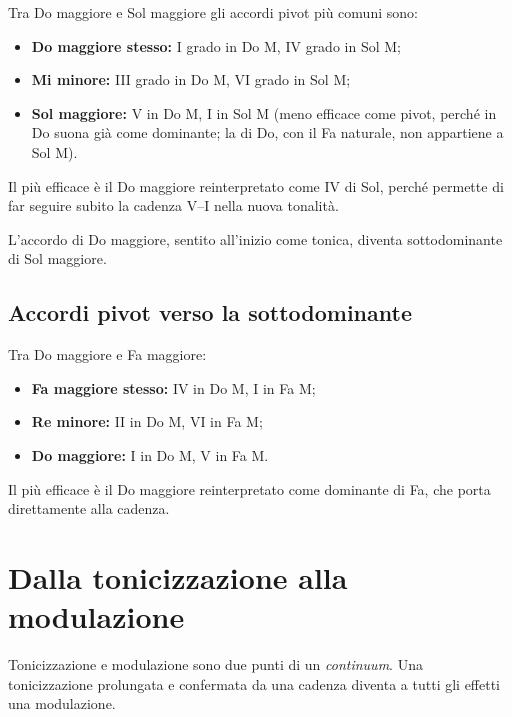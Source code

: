\begin{regola}
	\label{reg:pivot_dominante}
	Tra Do maggiore e Sol maggiore gli accordi pivot più comuni sono:
	\begin{itemize}
		\item \textbf{Do maggiore stesso:} I grado in Do M, IV grado in Sol M;
		\item \textbf{Mi minore:} III grado in Do M, VI grado in Sol M;
		\item \textbf{Sol maggiore:} V in Do M, I in Sol M (meno efficace come pivot, perché in Do suona già come dominante; la  di Do, con il Fa naturale, non appartiene a Sol M).
	\end{itemize}
	Il più efficace è il Do maggiore reinterpretato come IV di Sol, perché permette di far seguire subito la cadenza V--I nella nuova tonalità.
\end{regola}

\begin{esempio}[Modulazione Do maggiore $\rightarrow$ Sol maggiore con pivot I = IV]
	\label{ex:mod_do_sol}
	L'accordo di Do maggiore, sentito all'inizio come tonica, diventa sottodominante di Sol maggiore.
\end{esempio}

\subsection{Accordi pivot verso la sottodominante}
\label{subsec:pivot_sottodominante}

\begin{regola}
	\label{reg:pivot_sottodominante}
	Tra Do maggiore e Fa maggiore:
	\begin{itemize}
		\item \textbf{Fa maggiore stesso:} IV in Do M, I in Fa M;
		\item \textbf{Re minore:} II in Do M, VI in Fa M;
		\item \textbf{Do maggiore:} I in Do M, V in Fa M.
	\end{itemize}
	Il più efficace è il Do maggiore reinterpretato come dominante di Fa, che porta direttamente alla cadenza.
\end{regola}

\begin{esempio}[Modulazione Do maggiore $\rightarrow$ Fa maggiore con pivot I = V]
	\label{ex:mod_do_fa}
\end{esempio}

\section{Dalla tonicizzazione alla modulazione}
\label{sec:collegamento_mod}

Tonicizzazione e modulazione sono due punti di un \textit{continuum}. Una tonicizzazione prolungata e confermata da una cadenza diventa a tutti gli effetti una modulazione.
